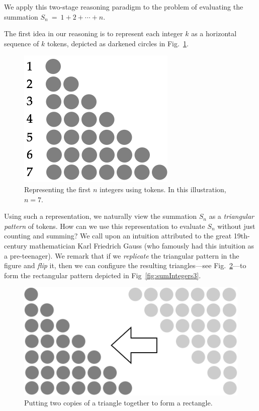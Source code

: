 We apply this two-stage reasoning paradigm to the problem of
evaluating the summation $S_n \ = \ 1 + 2 + \cdots + n$.

The first idea in our reasoning is to represent each integer $k$ as a
horizontal sequence of $k$ tokens, depicted as darkened circles in
Fig.~\ref{fig:sumIntegers1}.
\begin{figure}[ht]
\begin{center}
       \includegraphics[scale=0.35]{FiguresMaths/SumIntegersBasis}
\caption{Representing the first $n$ integers using tokens.  In
  this illustration, $n=7$.}
       \label{fig:sumIntegers1}
\end{center}
\end{figure}
Using such a representation, we naturally view the summation $S_n$ as
a \textit{triangular pattern} of tokens.  How can we use this
representation to evaluate $S_n$ without just counting and summing?
We call upon an intuition attributed to the great 19th-century
mathematician Karl Friedrich Gauss 
 (who famously had
this intuition as a pre-teenager).  We remark that if we {\em
  replicate} the triangular pattern in the figure and {\em flip} it,
then we can configure the resulting triangles---see
Fig.~\ref{fig:sumIntegers2}---to form the rectangular pattern depicted
in Fig~\ref{fig:sumIntegers3}.
\begin{figure}[ht]
\begin{center}
       \includegraphics[scale=0.35]{FiguresMaths/SumIntegersIntermediate}
   \caption{Putting two copies of a triangle together to form a rectangle.}
       \label{fig:sumIntegers2}
\end{center}
\end{figure}
